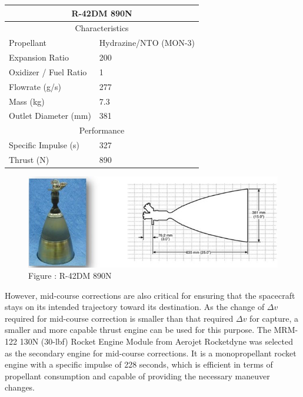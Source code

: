 \documentclass[conf]{new-aiaa}
\begin{document}
{\centering
\begin{tabular}{ |p{4cm}||p{4cm}|  }
\hline
\multicolumn{2}{|c|}{R-42DM 890N\cite{wilson_2020}}\\
 \hline
 \multicolumn{2}{|c|}{Characteristics} \\
 \hline
 Propellant&Hydrazine/NTO (MON-3)\\
 \hline
 Expansion Ratio&200\\
 \hline
 Oxidizer / Fuel Ratio&1\\
 \hline
 Flowrate (g/s)&277\\
 \hline
 Mass (kg)&7.3\\
 \hline
 Outlet Diameter (mm)&381\\
 \hline
 \multicolumn{2}{|c|}{Performance} \\
 \hline
 Specific Impulse (s)&327\\
 \hline
 Thrust (N)&890\\
 \hline

\end{tabular}
\par}

\begin{figure}[h!]
    \centering
    \includegraphics{Kims Pic 1.jpg}
    \caption{Figure : R-42DM 890N \cite{wilson_2020}}
    \label{fig:my_label}
\end{figure}

\par However, mid-course corrections are also critical for ensuring that the spacecraft stays on its intended trajectory toward its destination. As the change of $\Delta v$ required for mid-course correction is smaller than that required $\Delta v$ for capture, a smaller and more capable thrust engine can be used for this purpose\cite{burk_2005}. The MRM-122 130N (30-lbf) Rocket Engine Module from Aerojet Rocketdyne was selected as the secondary engine for mid-course corrections. It is a monopropellant rocket engine with a specific impulse of 228 seconds, which is efficient in terms of propellant consumption and capable of providing the necessary maneuver changes. \cite{wilson_2020}
\end{document}
